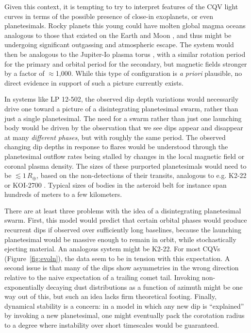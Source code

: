 \documentclass[11pt,twocolumn,tighten]{aastex63}
\begin{document}
Given this context, it is tempting to try to interpret features of the
CQV light curves in terms of the possible presence of close-in
exoplanets, or even planetesimals.  Rocky planets this young could
have molten global magma oceans analogous to those that existed on the
Earth and Moon \citep[see][]{2022arXiv220310023L}, and thus might be
undergoing significant outgassing and atmospheric escape.  The system
would then be analogous to the Jupiter-Io plasma torus
\citep[e.g.][]{1980JGR....85.1171N}, with a similar rotation period
for the primary and orbital period for the secondary, but magnetic
fields stronger by a factor of $\approx$1{,}000.  While this type of
configuration is {\it a priori} plausible, no direct evidence in
support of such a picture currently exists.

In systems like LP 12-502, the observed dip depth variations would
necessarily drive one toward a picture of a disintegrating
planetesimal swarm, rather than just a single planetesimal.  The need
for a swarm rather than just one launching body would be driven by the
observation that we see dips appear and disappear at many {\it
different phases}, but with roughly the same period.  The observed
changing dip depths in response to flares would be understood through
the planetesimal outflow rates being stalled by changes in the local
magnetic field or coronal plasma density.  The sizes of these
purported planetesimals would need to be $\lesssim 1$\,$R_\oplus$,
based on the non-detections of their transits, analogous to e.g.
K2-22 \citep{2015ApJ...812..112S} or KOI-2700
\citep{2014ApJ...784...40R}.  Typical sizes of bodies in the asteroid
belt for instance span hundreds of meters to a few kilometers.

There are at least three problems with the idea of a disintegrating
planetesimal swarm.  First, this model would predict that certain
orbital phases would produce recurrent dips if observed over
sufficiently long baselines, because the launching planetesimal would
be massive enough to remain in orbit, while stochastically ejecting
material.  An analogous system might be K2-22.  For most CQVs
(Figure~\ref{fig:evoln}), the data seem to be in tension with this
expectation.  A second issue is that many of the dips show asymmetries
in the wrong direction relative to the naive expectation of a trailing
comet tail.  Invoking non-exponentially decaying dust distributions as
a function of azimuth might be one way out of this, but such an idea
lacks firm theoretical footing.  Finally, dynamical stability is a
concern: in a model in which any new dip is ``explained'' by invoking
a new planetesimal, one might eventually pack the corotation radius to
a degree where instability over short timescales would be guaranteed.
\end{document}
